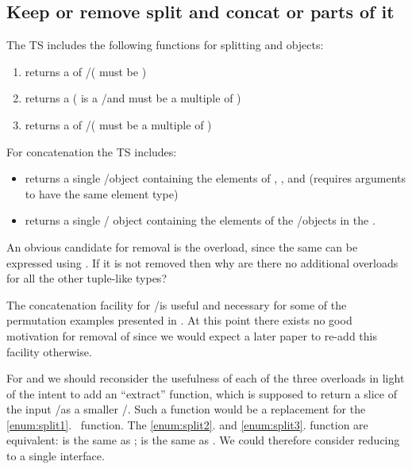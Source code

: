 \subsection{Keep or remove split and concat or parts of it}\label{sec:splitandconcat}
The TS includes the following functions for splitting \simd and \mask objects:
\begin{enumerate}
  \item\label{enum:split1} \stdx{} returns a
    \std{} of \simd/\mask ( must be )

  \item\label{enum:split2} \stdx{} returns a \std{} ( is a \simd/\mask and  must be a multiple of
    )

  \item\label{enum:split3} \stdx{} returns a
    \std{} of \simd/\mask ( must be a multiple of
    )
\end{enumerate}

For concatenation the TS includes:
\begin{itemize}
  \item \stdx{} returns a single \simd/\mask object
    containing the elements of , , and  (requires
    arguments to have the same element type)

  \item \stdx{} returns a single \simd/\mask
    object containing the elements of the \simd/\mask objects in the
    \std{}.
\end{itemize}

An obvious candidate for removal is the  overload, since
the same can be expressed using \std{}.
If it is not removed then why are there no additional overloads for all the
other tuple-like types?

The concatenation facility for \simd/\mask is useful and necessary for some of
the permutation examples presented in \cite{P2664R2}.
At this point there exists no good motivation for removal of 
since we would expect a later paper to re-add this facility otherwise.

For  and  we should reconsider the usefulness of
each of the three overloads in light of the intent to add an ``extract''
function, which is supposed to return a slice of the input \simd/\mask as a
smaller \simd/\mask.
Such a function would be a replacement for the \ref{enum:split1}.~
function.
The \ref{enum:split2}. and \ref{enum:split3}. function are equivalent:
 is the same as
;  is the same as
.
We could therefore consider reducing  to a single interface.

